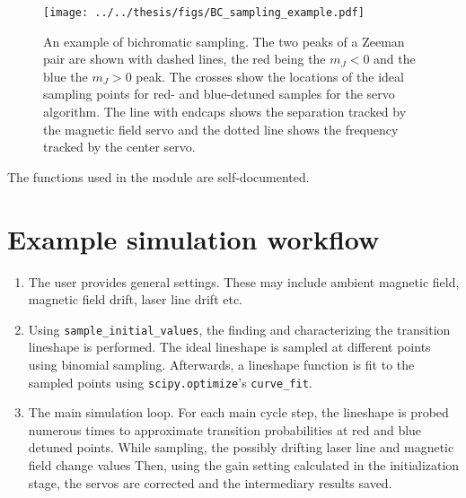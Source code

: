 \documentclass[a4paper,12pt]{article}
\begin{document}
\begin{figure}
  \texttt{[image: ../../thesis/figs/BC\_sampling\_example.pdf]}
  \centering
  \caption{
    An example of bichromatic sampling.
    The two peaks of a Zeeman pair are shown with dashed lines, the red being
    the $m_J < 0$ and the blue the $m_J > 0$ peak.
    The crosses show the locations of the ideal sampling points for red- and
    blue-detuned samples for the servo algorithm.
    The line with endcaps shows the separation tracked by the magnetic field
    servo and the dotted line shows the frequency tracked by the center servo.
  }
  \label{fig:BC_example}
\end{figure}

The functions used in the module are self-documented.

\section{Example simulation workflow}

\begin{enumerate}
    \item The user provides general settings.
    These may include ambient magnetic field, magnetic field drift, 
    laser line drift etc.
    \item Using \texttt{sample\_initial\_values}, the finding and characterizing
    the transition lineshape is performed.
    The ideal lineshape is sampled at different points using binomial sampling.
    Afterwards, a lineshape function is fit to the sampled points using 
    \texttt{scipy.optimize}'s \texttt{curve\_fit}.
    \item The main simulation loop.
    For each main cycle step, the lineshape is probed numerous times to approximate
    transition probabilities at red and blue detuned points.
    While sampling, the possibly drifting laser line and magnetic field
    change values
    Then, using the gain setting calculated in the initialization stage, the 
    servos are corrected and the intermediary results saved.
\end{enumerate}


\end{document}
